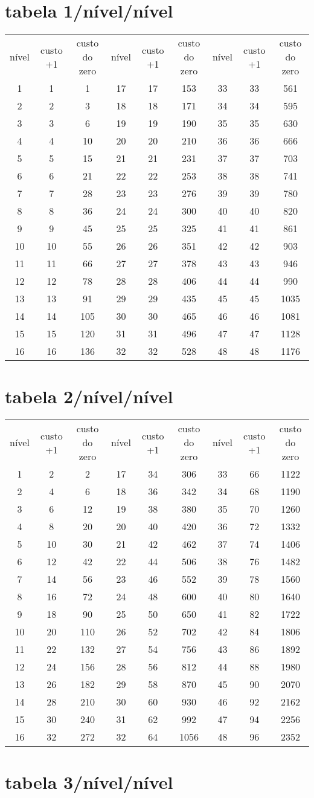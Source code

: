 \section{tabela 1/nível/nível} 
\begin{longtable}{|c|c|c|c|c|c|c|c|c|}
    nível&custo +1&custo do zero&nível&custo +1&custo do zero&nível&custo +1&custo do zero\tabularnewline 
     1 & 1 & 1 & 17 & 17 & 153 & 33 & 33 & 561 \tabularnewline 
     2 & 2 & 3 & 18 & 18 & 171 & 34 & 34 & 595 \tabularnewline 
     3 & 3 & 6 & 19 & 19 & 190 & 35 & 35 & 630 \tabularnewline 
     4 & 4 & 10 & 20 & 20 & 210 & 36 & 36 & 666 \tabularnewline 
     5 & 5 & 15 & 21 & 21 & 231 & 37 & 37 & 703 \tabularnewline 
     6 & 6 & 21 & 22 & 22 & 253 & 38 & 38 & 741 \tabularnewline 
     7 & 7 & 28 & 23 & 23 & 276 & 39 & 39 & 780 \tabularnewline 
     8 & 8 & 36 & 24 & 24 & 300 & 40 & 40 & 820 \tabularnewline 
     9 & 9 & 45 & 25 & 25 & 325 & 41 & 41 & 861 \tabularnewline 
     10 & 10 & 55 & 26 & 26 & 351 & 42 & 42 & 903 \tabularnewline 
     11 & 11 & 66 & 27 & 27 & 378 & 43 & 43 & 946 \tabularnewline 
     12 & 12 & 78 & 28 & 28 & 406 & 44 & 44 & 990 \tabularnewline 
     13 & 13 & 91 & 29 & 29 & 435 & 45 & 45 & 1035 \tabularnewline 
     14 & 14 & 105 & 30 & 30 & 465 & 46 & 46 & 1081 \tabularnewline 
     15 & 15 & 120 & 31 & 31 & 496 & 47 & 47 & 1128 \tabularnewline 
     16 & 16 & 136 & 32 & 32 & 528 & 48 & 48 & 1176 \tabularnewline  
\end{longtable} \section{tabela 2/nível/nível} 
\begin{longtable}{|c|c|c|c|c|c|c|c|c|}
    nível&custo +1&custo do zero&nível&custo +1&custo do zero&nível&custo +1&custo do zero\tabularnewline 
     1 & 2 & 2 & 17 & 34 & 306 & 33 & 66 & 1122 \tabularnewline 
     2 & 4 & 6 & 18 & 36 & 342 & 34 & 68 & 1190 \tabularnewline 
     3 & 6 & 12 & 19 & 38 & 380 & 35 & 70 & 1260 \tabularnewline 
     4 & 8 & 20 & 20 & 40 & 420 & 36 & 72 & 1332 \tabularnewline 
     5 & 10 & 30 & 21 & 42 & 462 & 37 & 74 & 1406 \tabularnewline 
     6 & 12 & 42 & 22 & 44 & 506 & 38 & 76 & 1482 \tabularnewline 
     7 & 14 & 56 & 23 & 46 & 552 & 39 & 78 & 1560 \tabularnewline 
     8 & 16 & 72 & 24 & 48 & 600 & 40 & 80 & 1640 \tabularnewline 
     9 & 18 & 90 & 25 & 50 & 650 & 41 & 82 & 1722 \tabularnewline 
     10 & 20 & 110 & 26 & 52 & 702 & 42 & 84 & 1806 \tabularnewline 
     11 & 22 & 132 & 27 & 54 & 756 & 43 & 86 & 1892 \tabularnewline 
     12 & 24 & 156 & 28 & 56 & 812 & 44 & 88 & 1980 \tabularnewline 
     13 & 26 & 182 & 29 & 58 & 870 & 45 & 90 & 2070 \tabularnewline 
     14 & 28 & 210 & 30 & 60 & 930 & 46 & 92 & 2162 \tabularnewline 
     15 & 30 & 240 & 31 & 62 & 992 & 47 & 94 & 2256 \tabularnewline 
     16 & 32 & 272 & 32 & 64 & 1056 & 48 & 96 & 2352 \tabularnewline  
\end{longtable} \section{tabela 3/nível/nível} 
